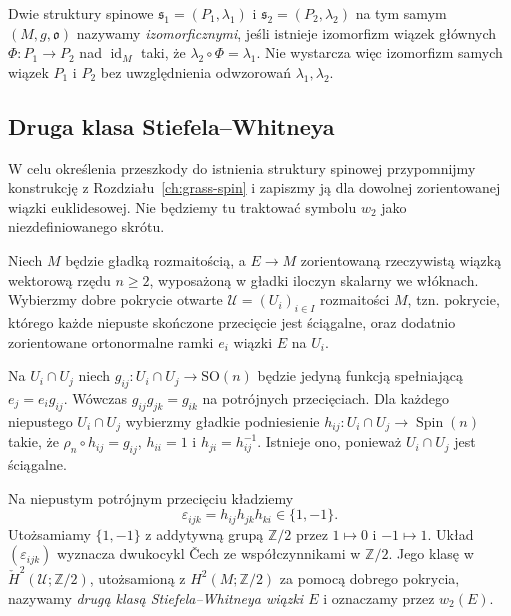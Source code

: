 Dwie struktury spinowe $\mathfrak s_1=(P_1,\lambda_1)$
i $\mathfrak s_2=(P_2,\lambda_2)$ na tym samym
$(M,g,\mathfrak o)$ nazywamy \emph{izomorficznymi},
jeśli istnieje izomorfizm wiązek głównych
$\Phi:P_1\to P_2$ nad $\operatorname{id}_M$ taki,
że $\lambda_2\circ\Phi=\lambda_1$. Nie wystarcza więc
izomorfizm samych wiązek $P_1$ i $P_2$ bez uwzględnienia
odwzorowań $\lambda_1,\lambda_2$.

\subsection{Druga klasa Stiefela--Whitneya}

W celu określenia przeszkody do istnienia struktury spinowej
przypomnijmy konstrukcję z Rozdziału~\ref{ch:grass-spin}
i zapiszmy ją dla dowolnej zorientowanej wiązki euklidesowej.
Nie będziemy tu traktować symbolu $w_2$ jako niezdefiniowanego
skrótu.

\begin{definicja}
\label{def:spin-w2}
Niech $M$ będzie gładką rozmaitością, a $E\to M$
zorientowaną rzeczywistą wiązką wektorową rzędu
$n\geq2$, wyposażoną w gładki iloczyn skalarny
we włóknach. Wybierzmy dobre pokrycie otwarte
$\mathcal U=(U_i)_{i\in I}$ rozmaitości $M$, tzn.
pokrycie, którego każde niepuste skończone przecięcie
jest ściągalne, oraz dodatnio zorientowane ortonormalne
ramki $e_i$ wiązki $E$ na $U_i$.

Na $U_i\cap U_j$ niech $g_{ij}:U_i\cap U_j\to\mathrm{SO}(n)$
będzie jedyną funkcją spełniającą $e_j=e_i g_{ij}$.
Wówczas $g_{ij}g_{jk}=g_{ik}$ na potrójnych przecięciach.
Dla każdego niepustego $U_i\cap U_j$ wybierzmy gładkie
podniesienie $h_{ij}:U_i\cap U_j\to\operatorname{Spin}(n)$
takie, że $\rho_n\circ h_{ij}=g_{ij}$,
$h_{ii}=1$ i $h_{ji}=h_{ij}^{-1}$. Istnieje ono, ponieważ
$U_i\cap U_j$ jest ściągalne.

Na niepustym potrójnym przecięciu kładziemy
\begin{equation}\label{eq:spin-w2-cocycle}
 \varepsilon_{ijk}=h_{ij}h_{jk}h_{ki}\in\{1,-1\}.
\end{equation}
Utożsamiamy $\{1,-1\}$ z addytywną grupą
$\mathbb Z/2$ przez $1\mapsto0$ i $-1\mapsto1$.
Układ $(\varepsilon_{ijk})$ wyznacza dwukocykl \v{C}ech
ze współczynnikami w $\mathbb Z/2$. Jego klasę
w $\check H^2(\mathcal U;\mathbb Z/2)$, utożsamioną
z $H^2(M;\mathbb Z/2)$ za pomocą dobrego pokrycia,
nazywamy \emph{drugą klasą Stiefela--Whitneya wiązki $E$}
i oznaczamy przez $w_2(E)$.
\end{definicja}

